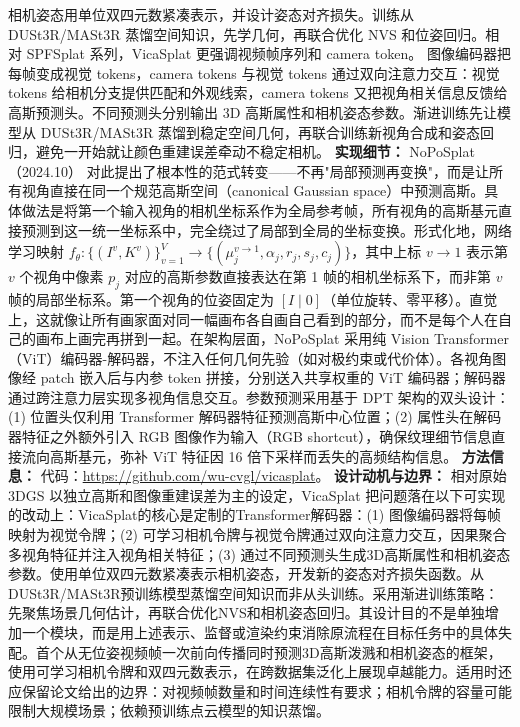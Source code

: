 相机姿态用单位双四元数紧凑表示，并设计姿态对齐损失。训练从 DUSt3R/MASt3R 蒸馏空间知识，先学几何，再联合优化 NVS 和位姿回归。相对 SPFSplat 系列，VicaSplat 更强调视频帧序列和 camera token。
图像编码器把每帧变成视觉 tokens，camera tokens 与视觉 tokens 通过双向注意力交互：视觉 tokens 给相机分支提供匹配和外观线索，camera tokens 又把视角相关信息反馈给高斯预测头。不同预测头分别输出 3D 高斯属性和相机姿态参数。渐进训练先让模型从 DUSt3R/MASt3R 蒸馏到稳定空间几何，再联合训练新视角合成和姿态回归，避免一开始就让颜色重建误差牵动不稳定相机。
\textbf{实现细节：} NoPoSplat（2024.10） 对此提出了根本性的范式转变——不再"局部预测再变换"，而是让所有视角直接在同一个规范高斯空间（canonical Gaussian space）中预测高斯。具体做法是将第一个输入视角的相机坐标系作为全局参考帧，所有视角的高斯基元直接预测到这一统一坐标系中，完全绕过了局部到全局的坐标变换。形式化地，网络学习映射 $f_\theta: \{(I^v, K^v)\}_{v=1}^V \rightarrow \{(\mu_j^{v \rightarrow 1}, \alpha_j, r_j, s_j, c_j)\}$，其中上标 $v \rightarrow 1$ 表示第 $v$ 个视角中像素 $p_j$ 对应的高斯参数直接表达在第 1 帧的相机坐标系下，而非第 $v$ 帧的局部坐标系。第一个视角的位姿固定为 $[I \mid 0]$（单位旋转、零平移）。直觉上，这就像让所有画家面对同一幅画布各自画自己看到的部分，而不是每个人在自己的画布上画完再拼到一起。在架构层面，NoPoSplat 采用纯 Vision Transformer（ViT）编码器-解码器，不注入任何几何先验（如对极约束或代价体）。各视角图像经 patch 嵌入后与内参 token 拼接，分别送入共享权重的 ViT 编码器；解码器通过跨注意力层实现多视角信息交互。参数预测采用基于 DPT 架构的双头设计：(1) 位置头仅利用 Transformer 解码器特征预测高斯中心位置；(2) 属性头在解码器特征之外额外引入 RGB 图像作为输入（RGB shortcut），确保纹理细节信息直接流向高斯基元，弥补 ViT 特征因 16 倍下采样而丢失的高频结构信息。
\textbf{方法信息：} 代码：\url{https://github.com/wu-cvgl/vicasplat}。
\textbf{设计动机与边界：} 相对原始 3DGS 以独立高斯和图像重建误差为主的设定，VicaSplat 把问题落在以下可实现的改动上：VicaSplat的核心是定制的Transformer解码器：(1) 图像编码器将每帧映射为视觉令牌；(2) 可学习相机令牌与视觉令牌通过双向注意力交互，因果聚合多视角特征并注入视角相关特征；(3) 通过不同预测头生成3D高斯属性和相机姿态参数。使用单位双四元数紧凑表示相机姿态，开发新的姿态对齐损失函数。从DUSt3R/MASt3R预训练模型蒸馏空间知识而非从头训练。采用渐进训练策略：先聚焦场景几何估计，再联合优化NVS和相机姿态回归。其设计目的不是单独增加一个模块，而是用上述表示、监督或渲染约束消除原流程在目标任务中的具体失配。首个从无位姿视频帧一次前向传播同时预测3D高斯泼溅和相机姿态的框架，使用可学习相机令牌和双四元数表示，在跨数据集泛化上展现卓越能力。适用时还应保留论文给出的边界：对视频帧数量和时间连续性有要求；相机令牌的容量可能限制大规模场景；依赖预训练点云模型的知识蒸馏。
